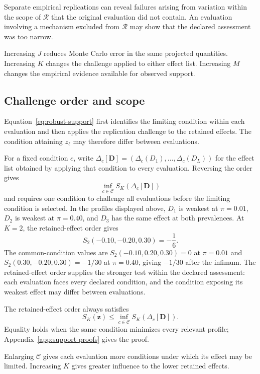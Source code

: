 \documentclass[11pt]{article}
\newcommand{\Regime}{\mathcal{R}}
\newcommand{\CSet}{\mathcal{C}}
\theoremstyle{remark}
\begin{document}
Separate empirical replications can reveal failures arising from variation within the scope of $\Regime$ that the original evaluation did not contain. An evaluation involving a mechanism excluded from $\Regime$ may show that the declared assessment was too narrow.

Increasing $J$ reduces Monte Carlo error in the same projected quantities. Increasing $K$ changes the challenge applied to either effect list. Increasing $M$ changes the empirical evidence available for observed support.

\subsection{Challenge order and scope}

Equation~\eqref{eq:robust-support} first identifies the limiting condition within each evaluation and then applies the replication challenge to the retained effects. The condition attaining $z_\ell$ may therefore differ between evaluations.

For a fixed condition $c$, write $\Delta_c[\mathbf D]=(\Delta_c(D_1),\ldots,\Delta_c(D_L))$ for the effect list obtained by applying that condition to every evaluation. Reversing the order gives
\[
\inf_{c\in\CSet}
S_K\left(\Delta_c[\mathbf D]\right)
\]
and requires one condition to challenge all evaluations before the limiting
condition is selected. In the profiles displayed above, $D_1$ is weakest at
$\pi=0.01$, $D_2$ is weakest at $\pi=0.40$, and $D_3$ has the same effect at
both prevalences. At $K=2$, the retained-effect order gives
\[
S_2(-0.10,-0.20,0.30)=-\frac16.
\]
The common-condition values are
$S_2(-0.10,0.20,0.30)=0$ at $\pi=0.01$ and
$S_2(0.30,-0.20,0.30)=-1/30$ at $\pi=0.40$, giving $-1/30$ after the
infimum. The retained-effect order supplies the stronger test within the
declared assessment: each evaluation faces every declared condition, and the
condition exposing its weakest effect may differ between evaluations.

The retained-effect order always satisfies
\begin{equation}
S_K(\mathbf z)
\leq
\inf_{c\in\CSet}
S_K\left(\Delta_c[\mathbf D]\right).
\label{eq:order}
\end{equation}
Equality holds when the same condition minimizes every relevant profile; Appendix~\ref{app:support-proofs} gives the proof.

Enlarging $\CSet$ gives each evaluation more conditions under which its effect may be limited. Increasing $K$ gives greater influence to the lower retained effects.
\end{document}
